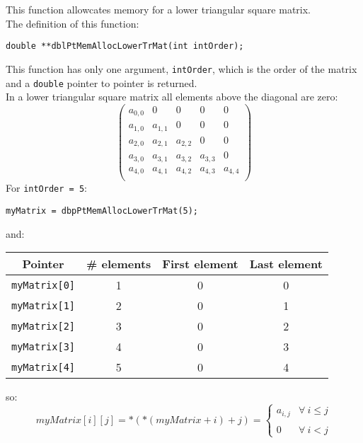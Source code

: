 This function allowcates memory for a lower triangular square matrix.\\

The definition of this function:
%
\begin{verbatim}
double **dblPtMemAllocLowerTrMat(int intOrder);
\end{verbatim}

This function has only one argument, \texttt{intOrder}, which is the order of the matrix and a \texttt{double} pointer to pointer is returned.\\

In a lower triangular square matrix all elements above the diagonal are zero: 
%
\begin{displaymath}
\left( \begin{array}{ccccc}
  a_{0,0} & 0      & 0      & 0      & 0 \\
  a_{1,0} & a_{1,1} & 0      & 0      & 0 \\ 
  a_{2,0} & a_{2,1} & a_{2,2} & 0      & 0 \\
  a_{3,0} & a_{3,1} & a_{3,2} & a_{3,3} & 0 \\
  a_{4,0} & a_{4,1} & a_{4,2} & a_{4,3} & a_{4,4} \\
\end{array} \right)
\end{displaymath}
%
For \texttt{intOrder = 5}:
%
\begin{verbatim}
myMatrix = dbpPtMemAllocLowerTrMat(5);  
\end{verbatim}
%
and:
\begin{center}
  \begin{tabular}{|c|c|c|c|}
    \hline
    \textbf{Pointer} & \textbf{\# elements} & \textbf{First element} & \textbf{Last element}\\
    \hline
    \texttt{myMatrix[0]} & 1 & 0 & 0\\
    \hline
    \texttt{myMatrix[1]} & 2 & 0 & 1\\
    \hline
    \texttt{myMatrix[2]} & 3 & 0 & 2\\
    \hline
    \texttt{myMatrix[3]} & 4 & 0 & 3\\
    \hline
    \texttt{myMatrix[4]} & 5 & 0 & 4\\
    \hline
  \end{tabular}
\end{center}
%
so:
%
\begin{displaymath}
  myMatrix[i][j] = *(*(myMatrix + i) + j) = \left\{ \begin{array}{ll}
    a_{i,j} & \forall \ i \le j \\
     & \\
    0 & \forall \ i < j
    \end{array} \right.    
\end{displaymath}

